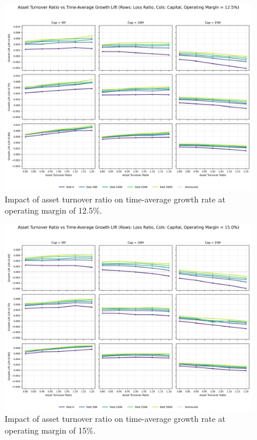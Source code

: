 \documentclass[11pt,letterpaper]{article}
\begin{document}
\begin{figure}[htbp]
    \centering
    \includegraphics[width=1.0\textwidth]{images/option3_multiples_ebit_0.125.png}
    \caption{Impact of asset turnover ratio on time-average growth rate at operating margin of 12.5\%.}
    \label{fig:multiples_ebit_0.125}
\end{figure}

\begin{figure}[htbp]
    \centering
    \includegraphics[width=1.0\textwidth]{images/option3_multiples_ebit_0.150.png}
    \caption{Impact of asset turnover ratio on time-average growth rate at operating margin of 15\%.}
    \label{fig:multiples_ebit_0.150}
\end{figure}
\end{document}
